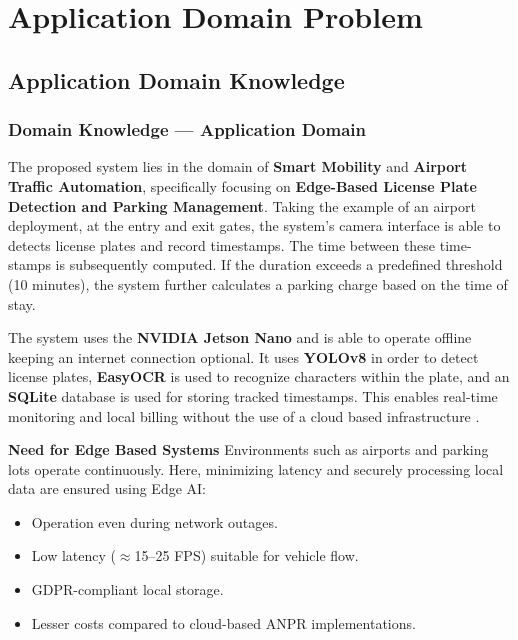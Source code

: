 %
%
%




\chapter{Application Domain Problem}


\section{Application Domain Knowledge}

\subsection{Domain Knowledge — Application Domain}
The proposed system lies in the domain of \textbf{Smart Mobility} and \textbf{Airport Traffic Automation}, specifically focusing on \textbf{Edge-Based License Plate Detection and Parking Management}.  
Taking the example of an airport deployment, at the entry and exit gates, the system's camera interface is able to detects license plates and record timestamps. The time between these time-stamps is subsequently computed. If the duration exceeds a predefined threshold (10 minutes), the system further calculates a parking charge based on the time of stay.

The system uses the \textbf{NVIDIA Jetson Nano} and is able to operate offline keeping an internet connection optional. It uses \textbf{YOLOv8} in order to detect license plates, \textbf{EasyOCR} is used to recognize characters within the plate, and an \textbf{SQLite} database is used for storing tracked timestamps. This enables real-time monitoring and local billing without the use of a cloud based infrastructure \cite{anpr-survey-2020, easyocr-2020, nvidia-jetson}.

\vspace{0.5em}
\noindent\textbf{Need for Edge Based Systems}  
Environments such as airports and parking lots operate continuously. Here, minimizing latency and securely processing local data are ensured using Edge \ac{AI}:
\begin{itemize}
	\item Operation even during network outages.
	\item Low latency ($\approx$15–25 FPS) suitable for vehicle flow.
	\item \ac{GDPR}-compliant local storage.
	\item Lesser costs compared to cloud-based \ac{ANPR} implementations.
\end{itemize}

